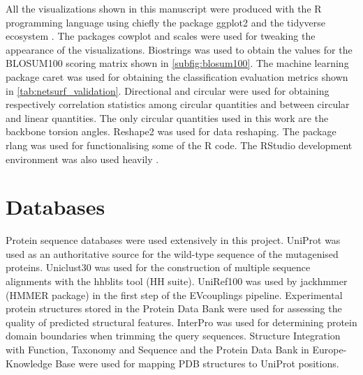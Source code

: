 All the visualizations shown in this manuscript were produced with the R programming language \parencite[version 4.0.5]{RCT2021} using chiefly the package ggplot2 \parencite[version 3.3.3]{Wickham2016} and the tidyverse ecosystem \parencite[version 1.3.1]{Wickham2019}.
The packages cowplot \parencite[version 1.1.1]{Wilke2020} and scales \parencite[version 1.1.1]{Wickham2020} were used for tweaking the appearance of the visualizations.
Biostrings \parencite[version 2.56.0]{Pages2020} was used to obtain the values for the BLOSUM100 scoring matrix \parencite{Henikoff1992} shown in \autoref{subfig:blosum100}.
The machine learning package caret \parencite[version 6.0--88]{Kuhn2021} was used for obtaining the classification evaluation metrics shown in \autoref{tab:netsurf_validation}.
Directional \parencite[version 4.9]{Tsagris2021} and circular \parencite[version 0.4--93]{Agostinelli2017} were used for obtaining respectively correlation statistics among circular quantities and between circular and linear quantities.
The only circular quantities used in this work are the backbone torsion angles.
Reshape2 \parencite[version 1.4.4]{Wickham2007} was used for data reshaping.
The package rlang \parencite[version 0.4.11]{Henry2021} was used for functionalising some of the R code.
The RStudio development environment was also used heavily \parencite[version 1.4.1103 ``Wax Begonia'']{RStudioTeam2021}.

\section{Databases}
Protein sequence databases were used extensively in this project.
UniProt \parencite[release \texttt{2021\_02}]{Bateman2020} was used as an authoritative source for the wild-type sequence of the mutagenised proteins.
Uniclust30 \parencite[release \texttt{2020\_06}]{Mirdita2016} was used for the construction of multiple sequence alignments with the hhblits tool (HH suite).
UniRef100 \parencite[release \texttt{2021\_4}]{Suzek2014} was used by jackhmmer (HMMER package) in the first step of the EVcouplings pipeline.
Experimental protein structures stored in the Protein Data Bank \parencite[PDB,][accessed in March 2021]{Burley2018} were used for assessing the quality of predicted structural features.
InterPro \parencite[release 84.0]{Blum2020} was used for determining protein domain boundaries when trimming the query sequences.
Structure Integration with Function, Taxonomy and Sequence \parencite[SIFTS,][accessed in March 2021]{Dana2018} and the Protein Data Bank in Europe-Knowledge Base \parencite[PDBe-KB,][accessed in March 2021]{Varadi2019} were used for mapping PDB structures to UniProt positions.

